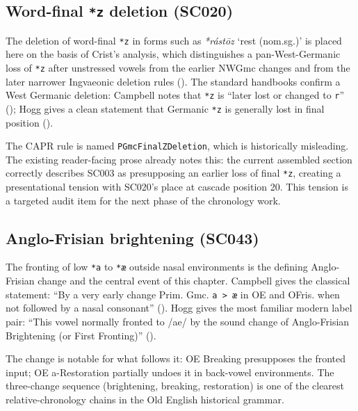 \documentclass[
  british,
  a4paper,
  openany]{book}
\providecommand{\Recon}[1]{\emph{*#1}}
{\catcode`→=\active \global\def→{\ensuremath{\rightarrow}}}
\providecommand{\texorpdfstring}[2]{#1}
\providecommand{\Recon}[1]{\emph{*#1}}
{\catcode`→=\active \global\def→{\ensuremath{\rightarrow}}}
\begin{document}
\subsection{\texorpdfstring{Word-final \texttt{*z} deletion
(SC020)}{Word-final *z deletion (SC020)}}\label{word-final-z-deletion-sc020}

The deletion of word-final \texttt{*z} in forms such as
\Recon{rástōz}
`rest (nom.sg.)' is placed here on the basis of Crist's analysis, which
distinguishes a pan-West-Germanic loss of \texttt{*z} after unstressed
vowels from the earlier NWGmc changes and from the later narrower
Ingvaeonic deletion rules ().
The standard handbooks confirm a West Germanic deletion: Campbell notes
that \texttt{*z} is ``later lost or changed to \texttt{r}''
(); Hogg gives a clean
statement that Germanic \texttt{*z} is generally lost in final position
().

The CAPR rule is named \texttt{PGmcFinalZDeletion}, which is
historically misleading. The existing reader-facing prose already notes
this: the current assembled section correctly describes SC003 as
presupposing an earlier loss of final \texttt{*z}, creating a
presentational tension with SC020's place at cascade position 20. This
tension is a targeted audit item for the next phase of the chronology
work.

\subsection{Anglo-Frisian brightening
(SC043)}\label{anglo-frisian-brightening-sc043}

The fronting of low \texttt{*a} to \texttt{*æ} outside nasal
environments is the defining Anglo-Frisian change and the central event
of this chapter. Campbell gives the classical statement: ``By a very
early change Prim. Gmc. \texttt{a\ \textgreater{}\ æ} in OE and OFris.
when not followed by a nasal consonant''
(). Hogg gives
the most familiar modern label pair: ``This vowel normally fronted to
/ae/ by the sound change of Anglo-Frisian Brightening (or First
Fronting)'' ().

The change is notable for what follows it: OE Breaking presupposes the
fronted input; OE a-Restoration partially undoes it in back-vowel
environments. The three-change sequence (brightening, breaking,
restoration) is one of the clearest relative-chronology chains in the
Old English historical grammar.
\end{document}
